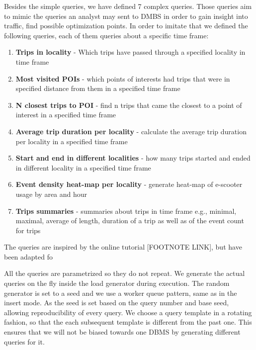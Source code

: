 Besides the simple queries, we have defined 7 complex queries.
Those queries aim to mimic the queries an analyst may sent to DMBS in order to gain insight into traffic, find possible optimization points.
In order to imitate that we defined the following queries, each of them queries about a specific time frame:
\begin{enumerate}
	\item \textbf{Trips in locality} - Which trips have passed through a specified locality in time frame
	\item \textbf{Most visited POIs} - which points of interests had trips that were in specified distance from them in a specified time frame
	\item \textbf{N closest trips to POI} - find n trips that came the closest to a point of interest in a specified time frame
	\item \textbf{Average trip duration per locality} - calculate the average trip duration per locality in a specified time frame
	\item \textbf{Start and end in different localities} - how many trips started and ended in different locality in a specified time frame
	\item \textbf{Event density heat-map per locality} - generate heat-map of e-scooter usage by area and hour
	\item \textbf{Trips summaries} - summaries about trips in time frame e.g., minimal, maximal, average of length, duration of a trip as well as of the event count for trips
\end{enumerate}

The queries are inspired by the online tutorial [FOOTNOTE LINK], but have been adapted fo

All the queries are parametrized so they do not repeat.
We generate the actual queries on the fly inside the load generator during execution. 
The random generator is set to a seed and we use a worker queue pattern, same as in the insert mode.
As the seed is set based on the query number and base seed, allowing reproducibility of every query.
We choose a query template in a rotating fashion, so that the each subsequent template is different from the past one.
This ensures that we will not be biased towards one DBMS by generating different queries for it.

